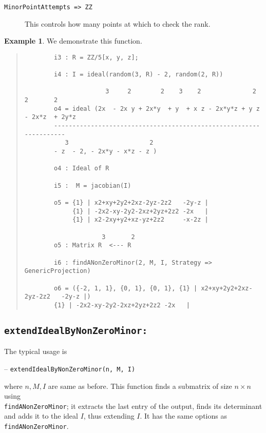 \documentclass[11pt]{amsart}
\theoremstyle{definition}
\newtheorem{example}{Example}[section]
\begin{document}
\begin{description}
    \item[\tt MinorPointAttempts => ZZ] 
  This controls how many points at which to check the rank.
\end{description}
\begin{example}
  We demonstrate this function.
  {{\small\color{blue}
  \begin{quote}
\begin{verbatim}
		i3 : R = ZZ/5[x, y, z];
		
		i4 : I = ideal(random(3, R) - 2, random(2, R))
		
		              3     2        2    3    2              2        2       2
		o4 = ideal (2x  - 2x y + 2x*y  + y  + x z - 2x*y*z + y z - 2x*z  + 2y*z 
		-------------------------------------------------------------------
		   3                      2
		- z  - 2, - 2x*y - x*z - z )
		
		o4 : Ideal of R
		
		i5 :  M = jacobian(I)
		
		o5 = {1} | x2+xy+2y2+2xz-2yz-2z2   -2y-z |
		     {1} | -2x2-xy-2y2-2xz+2yz+2z2 -2x   |
		     {1} | x2-2xy+y2+xz-yz+2z2     -x-2z |
		
		             3       2
		o5 : Matrix R  <--- R
		
		i6 : findANonZeroMinor(2, M, I, Strategy => GenericProjection)
		
		o6 = ({-2, 1, 1}, {0, 1}, {0, 1}, {1} | x2+xy+2y2+2xz-2yz-2z2   -2y-z |)
		{1} | -2x2-xy-2y2-2xz+2yz+2z2 -2x   |
\end{verbatim}
\end{quote}  
    }}
\end{example}

\subsection{\tt extendIdealByNonZeroMinor:}\label{extendIdealByNonZeroMinor} The typical usage is 

\vspace{0.5em}
-- {\tt extendIdealByNonZeroMinor(n, M, I)} 

\vspace{0.5em}
\noindent where $n,M,I$ are same as before. This function finds a submatrix of size $n\times n$ using \\{\tt findANonZeroMinor};  
it extracts the last entry of the output, finds its determinant and
adds it to the ideal $I$, thus extending $I$.   It has the same options as {\tt findANonZeroMinor}.
\end{document}
